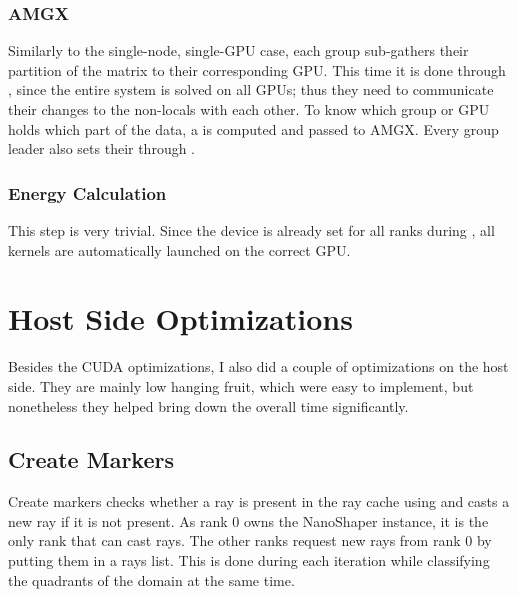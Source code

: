 

\subsubsection{AMGX}

Similarly to the single-node, single-GPU case, each group sub-gathers their partition of the matrix to their corresponding GPU.
This time it is done through , since the entire system is solved on all GPUs; thus they need to communicate their changes to the non-locals with each other.
To know which group or GPU holds which part of the data, a  is computed and passed to AMGX.
Every group leader also sets their  through .

\subsubsection{Energy Calculation}

This step is very trivial.
Since the device is already set for all ranks during , all kernels are automatically launched on the correct GPU.

\FloatBarrier

\section{Host Side Optimizations}
\label{sec:implementation-host-side}

Besides the CUDA optimizations, I also did a couple of optimizations on the host side.
They are mainly low hanging fruit, which were easy to implement, but nonetheless they helped bring down the overall time significantly.

\subsection{Create Markers}
\label{sec:implementation-host-side-create-markers}

Create markers checks whether a ray is present in the ray cache using  and casts a new ray if it is not present.
As rank 0 owns the NanoShaper instance, it is the only rank that can cast rays.
The other ranks request new rays from rank 0 by putting them in a rays list.
This is done during each iteration while classifying the quadrants of the domain at the same time.

